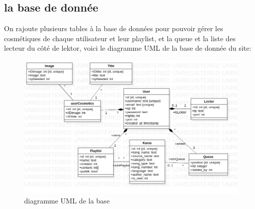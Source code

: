 \subsection{la base de donnée}
On rajoute plusieurs tables à la base de données pour pouvoir gérer les cosmétiques de chaque utilisateur et leur playlist, et la queue et la liste des lecteur du côté de lektor, voici le diagramme UML de la base de donnée du site:
\newline
\begin{figure}[h!]
\centering
\includegraphics[scale=0.4]{UML.png}
\caption{diagramme UML de la base}
\label{fig:diagramme UML}
\end{figure}
\newpage
